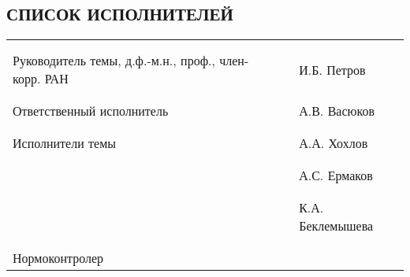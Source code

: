 \begin{center}\section*{СПИСОК ИСПОЛНИТЕЛЕЙ}\end{center}

\begin{table*}[ht]
\centering
\begin{tabular}{b{7cm} b{4cm} b{6cm}}
 & & \\
 & & \\
Руководитель темы, д.ф.-м.н., проф., член-корр. РАН & \hrulefill & И.Б. Петров \\
 & & \\
 & & \\
Ответственный исполнитель & \hrulefill & А.В. Васюков \\
 & & \\
 & & \\
Исполнители темы & \hrulefill & А.А. Хохлов \\
 & & \\
 & & \\
 & \hrulefill & А.С. Ермаков \\
 & & \\
 & & \\
 & \hrulefill & К.А. Беклемышева \\
 & & \\
 & & \\
Нормоконтролер & \hrulefill &  \\
\end{tabular}
\end{table*}

